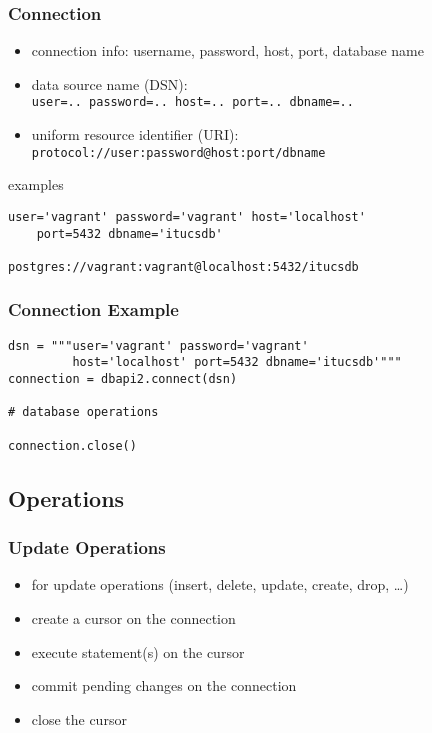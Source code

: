 \documentclass[dvipsnames]{beamer}
\theoremstyle{plain}
\begin{document}
\begin{frame}[fragile]
  \frametitle{Connection}

  \begin{itemize}
    \item connection info: username, password, host, port, database name

    \medskip
    \item data source name (DSN):\\
      \texttt{user=.. password=.. host=.. port=.. dbname=..}
    \item uniform resource identifier (URI):\\
      \texttt{protocol://user:password@host:port/dbname}
  \end{itemize}

  \medskip
  \begin{exampleblock}{examples}
    \begin{lstlisting}
user='vagrant' password='vagrant' host='localhost'
    port=5432 dbname='itucsdb'

postgres://vagrant:vagrant@localhost:5432/itucsdb
    \end{lstlisting}
  \end{exampleblock}
\end{frame}

\begin{frame}[fragile]
  \frametitle{Connection Example}

  \begin{lstlisting}
dsn = """user='vagrant' password='vagrant'
         host='localhost' port=5432 dbname='itucsdb'"""
connection = dbapi2.connect(dsn)

# database operations

connection.close()
  \end{lstlisting}
\end{frame}

\subsection{Operations}

\begin{frame}
  \frametitle{Update Operations}

  \begin{itemize}
    \item for update operations (insert, delete, update, create, drop, \ldots)

    \bigskip
    \item create a cursor on the connection
    \item execute statement(s) on the cursor
    \item commit pending changes on the connection
    \item close the cursor
  \end{itemize}
\end{frame}
\end{document}
